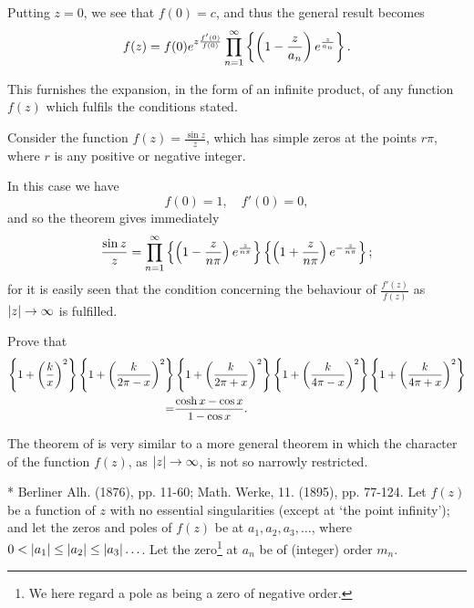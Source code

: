 Putting $z = 0$, we see that $f(0) = c$, and thus the general result
becomes
$$
f(z)
=
f(0)
e^{ z \frac{f'(0)}{f(0)} }
\prod_{n=1}^{\infty}
\left\{ 
  \left(  1 - \frac{z}{a_{n}}  \right)
  e^{ \frac{z}{a_{n}} }
 \right\}.
$$

This furnishes the expansion, in the form of an infinite product, of
any function $f(z)$ which fulfils the conditions stated.
\begin{wandwexample}
  Consider the function
  $f(z) = \frac{\sin z}{z}$, which has simple zeros at
  the points $r \pi$, where $r$ is any positive or negative integer.

  In this case we have
  $$
  f(0) = 1,
  \quad
  f'(0) = 0,
  $$
  and so the theorem gives immediately
  $$
  \frac{\sin z}{z}
  =
  \prod_{n=1}^{\infty}
  \left\{ 
    \left( 1 - \frac{z}{n \pi} \right)
    e^{ \frac{z}{n \pi} }
   \right\}
  \left\{ 
    \left( 1 + \frac{z}{n \pi} \right)
    e^{ -\frac{z}{n \pi} }
   \right\};
  $$
  for it is easily seen that the condition concerning the behaviour of
  $\frac{f'(z)}{f(z)}$ as $\left| z \right| \rightarrow \infty$ is fulfilled.
\end{wandwexample}
\begin{wandwexample}
  Prove that
  \begin{align*}
  \left\{ 
    1 + \left(  \frac{k}{x}   \right)^{2}
   \right\}
  \left\{ 
    1 + \left(  \frac{k}{2\pi - x}   \right)^{2}
   \right\}
  &
  \left\{ 
    1 + \left(  \frac{k}{2\pi + x}   \right)^{2}
   \right\}
  \left\{ 
    1 + \left(  \frac{k}{4\pi - x}   \right)^{2}
   \right\}
  \left\{ 
    1 + \left(  \frac{k}{4\pi + x}   \right)^{2}
   \right\}
  \\
  =&
  \frac{\cosh x - \cos x}{1-\cos x}.
  \end{align*}
\end{wandwexample}

The theorem of is very similar to a more general theorem in
which the character of the function $f(z)$, as
$\left| z \right| \rightarrow \infty$, is not so
narrowly restricted.

* Berliner Alh. (1876), pp. 11-60; Math. Werke, 11. (1895), pp.
77-124.
%
%
Let $f(z)$ be a function of $z$ with no essential singularities (except at
`the point infinity'); and let the zeros and poles of $f(z)$ be at
$a_{1}, a_{2}, a_{3}, \ldots$, where
$0 < \left| a_{1} \right| \leq \left| a_{2} \right| \leq \left| a_{3} \right| \ldots$.
Let the zero\footnote{We here regard a pole as being a zero of
  negative order.} at $a_{n}$ be of (integer) order $m_{n}$.

